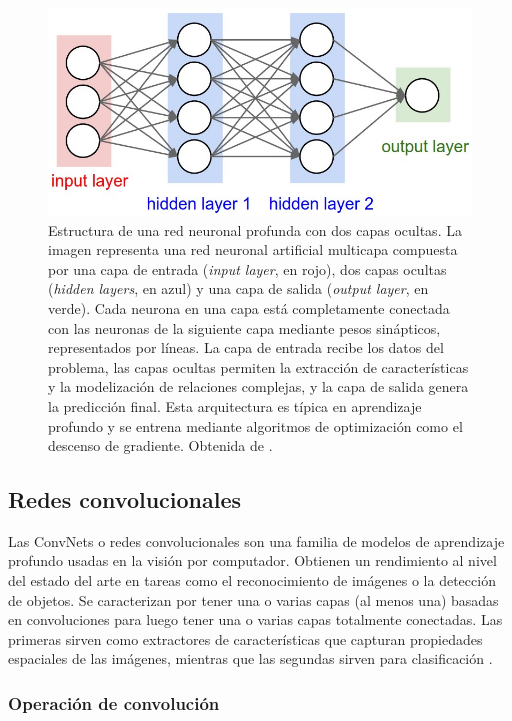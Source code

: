 \begin{figure}
    \centering
    \includegraphics[width=0.75\linewidth]{Plantilla_TFG_latex//imagenes//Inf//2.Fund/neural_net2.jpeg}
    \caption[Estructura de una red neuronal profunda con dos capas ocultas]{Estructura de una red neuronal profunda con dos capas ocultas. La imagen representa una red neuronal artificial multicapa compuesta por una capa de entrada (\textit{input layer}, en rojo), dos capas ocultas (\textit{hidden layers}, en azul) y una capa de salida (\textit{output layer}, en verde). Cada neurona en una capa está completamente conectada con las neuronas de la siguiente capa mediante pesos sinápticos, representados por líneas. La capa de entrada recibe los datos del problema, las capas ocultas permiten la extracción de características y la modelización de relaciones complejas, y la capa de salida genera la predicción final. Esta arquitectura es típica en aprendizaje profundo y se entrena mediante algoritmos de optimización como el descenso de gradiente. Obtenida de \cite{stanford_231}.}
    \label{fig:NeuralNet}
\end{figure}


\subsection{Redes convolucionales}
\label{sec:convnets}

Las ConvNets o redes convolucionales son una familia de modelos de aprendizaje profundo usadas en la visión por computador. Obtienen un rendimiento al nivel del estado del arte en tareas como el reconocimiento de imágenes o la detección de objetos. Se caracterizan por tener una o varias capas (al menos una) basadas en convoluciones para luego tener una o varias capas totalmente conectadas. Las primeras sirven como extractores de características que capturan propiedades espaciales de las imágenes, mientras que las segundas sirven para clasificación \cite{GoodFellowBook}.

\subsubsection{Operación de convolución}

